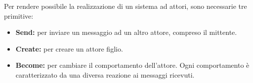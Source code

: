 	Per rendere possibile la realizzazione di un sistema ad attori, sono necessarie tre primitive:
	\begin{itemize}
		\item \textbf{Send:} per inviare un messaggio ad un altro attore, compreso il mittente.
		\item \textbf{Create:} per creare un attore figlio.
		\item \textbf{Become:} per cambiare il comportamento dell'attore. Ogni comportamento è caratterizzato da una diversa reazione ai messaggi ricevuti.
	\end{itemize}

	

